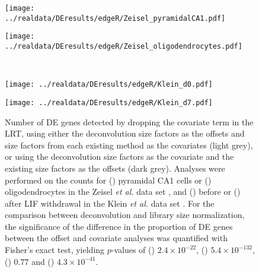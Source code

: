 \documentclass{article}
\begin{document}
\begin{figure}[btp]
    \begin{center}
        \begin{minipage}{0.48\textwidth}
            \texttt{[image: ../realdata/DEresults/edgeR/Zeisel\_pyramidalCA1.pdf]}
            \subcaption{}\label{subfig:assess_pyramidal}
        \end{minipage}
        \begin{minipage}{0.48\textwidth}
            \texttt{[image: ../realdata/DEresults/edgeR/Zeisel\_oligodendrocytes.pdf]}
            \subcaption{}\label{subfig:assess_oligodendrocytes}
        \end{minipage}\\[0.1in]
        \begin{minipage}{0.48\textwidth}
            \texttt{[image: ../realdata/DEresults/edgeR/Klein\_d0.pdf]}
            \subcaption{}\label{subfig:assess_d0}
        \end{minipage}
        \begin{minipage}{0.48\textwidth}
            \texttt{[image: ../realdata/DEresults/edgeR/Klein\_d7.pdf]}
            \subcaption{}\label{subfig:assess_d7}
        \end{minipage}
    \end{center}
    \caption{Number of DE genes detected by dropping the covariate term in the LRT, using either the deconvolution size factors as the offsets and size factors from each existing method as the covariates (light grey), or using the deconvolution size factors as the covariate and the existing size factors as the offsets (dark grey).
        Analyses were performed on the counts for () pyramidal CA1 cells or () oligodendrocytes in the Zeisel \textit{et al.} data set \cite{zeisel2015brain}, and () before or () after LIF withdrawal in the Klein \textit{et al.} data set \cite{klein2015droplet}.
        For the comparison between deconvolution and library size normalization, the significance of the difference in the proportion of DE genes between the offset and covariate analyses was quantified with Fisher's exact test, yielding $p$-values of () $2.4 \times 10^{-22}$, () $5.4 \times 10^{-132}$, () $0.77$ and () $4.3 \times 10^{-41}$.
    }
    \label{fig:assessment_results}
\end{figure}
\end{document}
